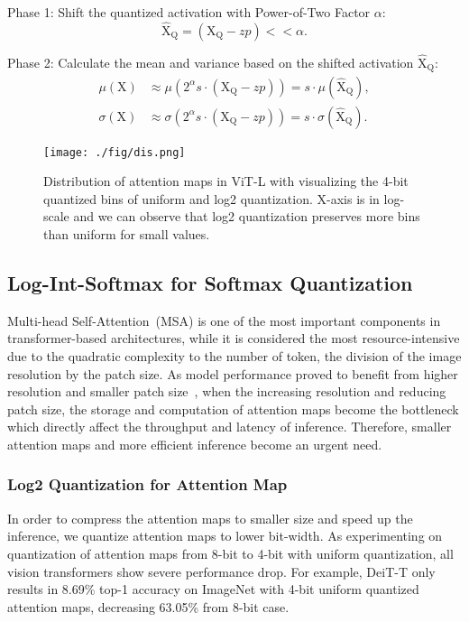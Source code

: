 \documentclass{article}
\begin{document}
Phase 1: Shift the quantized activation with Power-of-Two Factor $\alpha$:
\begin{equation}
    \widehat{\textrm{X}}_\textrm{Q}=(\textrm{X}_\textrm{Q}-zp)<<\alpha.
\end{equation}

Phase 2: Calculate the mean and variance based on the shifted activation $\widehat{\textrm{X}}_\textrm{Q}$:
\begin{align}
    \mu(\textrm{X})&\approx\mu(\textrm{2}^\alpha s\cdot (\textrm{X}_\textrm{Q}-zp))=s\cdot \mu(\widehat{\textrm{X}}_\textrm{Q}),\\
    \sigma(\textrm{X})&\approx\sigma(\textrm{2}^\alpha s\cdot (\textrm{X}_\textrm{Q}-zp))=s\cdot\sigma(\widehat{\textrm{X}}_\textrm{Q}).
\end{align}


\begin{figure}[t]
\centering
\texttt{[image: ./fig/dis.png]}
\caption{Distribution of attention maps in ViT-L with visualizing the 4-bit quantized bins of uniform and log2 quantization. X-axis is in log-scale and we can observe that log2 quantization preserves more bins than uniform for small values.}
\label{fig:sm_dis} 
\end{figure}


\subsection{Log-Int-Softmax for Softmax Quantization}
\label{sec:lis}

Multi-head Self-Attention~(MSA) is one of the most important components in transformer-based architectures, while it is considered the most resource-intensive due to the quadratic complexity to the number of token, the division of the image resolution by the patch size. As model performance proved to benefit from higher resolution and smaller patch size~\cite{dosovitskiy2021an}, when the increasing resolution and reducing patch size, the storage and computation of attention maps become the bottleneck which directly affect the throughput and latency of inference. Therefore, smaller attention maps and more efficient inference become an urgent need.


\subsubsection{Log2 Quantization for Attention Map}

In order to compress the attention maps to smaller size and speed up the inference, we quantize attention maps to lower bit-width. As experimenting on quantization of attention maps from 8-bit to 4-bit with uniform quantization, all vision transformers show severe performance drop. For example, DeiT-T only results in 8.69\% top-1 accuracy on ImageNet with 4-bit uniform quantized attention maps, decreasing 63.05\% from 8-bit case.
\end{document}

